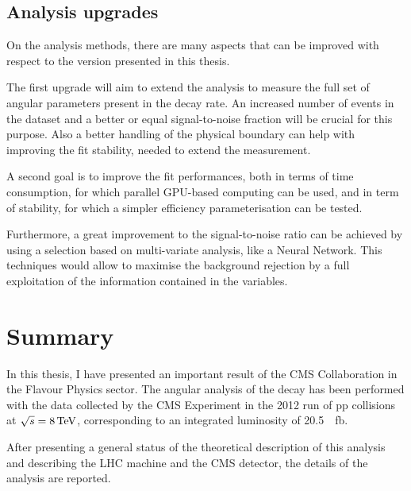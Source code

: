 
\subsection{Analysis upgrades}
\label{sec:AnalUpg}

On the analysis methods, there are many aspects that can be improved with respect to the version presented in this thesis.

The first upgrade will aim to extend the analysis to measure the full set of angular parameters present in the decay rate.
An increased number of events in the dataset and a better or equal signal-to-noise fraction will be crucial for this purpose.
Also a better handling of the physical boundary can help with improving the fit stability, needed to extend the measurement.

A second goal is to improve the fit performances, both in terms of time consumption, for which parallel GPU-based computing can be used, and in term of stability, for which a simpler efficiency parameterisation can be tested.

Furthermore, a great improvement to the signal-to-noise ratio can be achieved by using a selection based on multi-variate analysis, like a Neural Network. This techniques would allow to maximise the background rejection by a full exploitation of the information contained in the variables.


\section{Summary}
\label{sec:Summ}

In this thesis, I have presented an important result of the CMS Collaboration in the Flavour Physics sector.
The angular analysis of the \BtoKstmumu decay has been performed with the data collected by the CMS Experiment in the 2012 run of pp collisions at $\sqrt{s}=8\,\textrm{TeV}$, corresponding to an integrated luminosity of \SI{20.5}{\per\femto\barn}.

After presenting a general status of the theoretical description of this analysis and describing the LHC machine and the CMS detector, the details of the analysis are reported.

